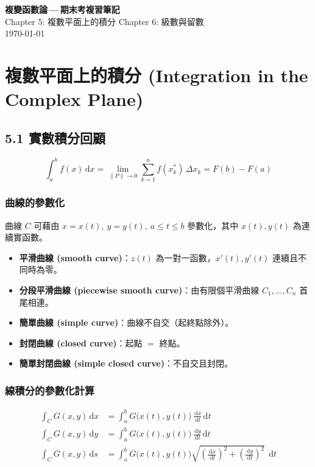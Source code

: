\documentclass[12pt,a4paper]{article}
\newcommand{\dd}{\,\mathrm{d}}
\begin{document}
\begin{center}
{\LARGE\bfseries 複變函數論\,---\,期末考複習筆記}\\[6pt]
{\large Chapter 5: 複數平面上的積分 \quad Chapter 6: 級數與留數}\\[4pt]
\today
\end{center}

\tableofcontents
\newpage

\section{複數平面上的積分 (Integration in the Complex Plane)}

\subsection{5.1 實數積分回顧}

\begin{defbox}[定積分]
$$\int_a^b f(x)\dd{x} = \lim_{\|P\|\to 0}\sum_{k=1}^{n}f(x_k^*)\,\Delta x_k = F(b)-F(a)$$
\end{defbox}

\subsubsection*{曲線的參數化}
曲線 $C$ 可藉由 $x=x(t),\ y=y(t),\ a\le t\le b$ 參數化，其中 $x(t),y(t)$ 為連續實函數。
\begin{itemize}[nosep]
\item \textbf{平滑曲線 (smooth curve)}：$z(t)$ 為一對一函數，$x'(t),y'(t)$ 連續且不同時為零。
\item \textbf{分段平滑曲線 (piecewise smooth curve)}：由有限個平滑曲線 $C_1,\dots,C_n$ 首尾相連。
\item \textbf{簡單曲線 (simple curve)}：曲線不自交（起終點除外）。
\item \textbf{封閉曲線 (closed curve)}：起點 $=$ 終點。
\item \textbf{簡單封閉曲線 (simple closed curve)}：不自交且封閉。
\end{itemize}

\subsubsection*{線積分的參數化計算}
\begin{align}
\int_C G(x,y)\dd{x} &= \int_a^b G\bigl(x(t),y(t)\bigr)\,\frac{\dd{x}}{\dd{t}}\dd{t} \\
\int_C G(x,y)\dd{y} &= \int_a^b G\bigl(x(t),y(t)\bigr)\,\frac{\dd{y}}{\dd{t}}\dd{t} \\
\int_C G(x,y)\dd{s} &= \int_a^b G\bigl(x(t),y(t)\bigr)\sqrt{\left(\frac{\dd{x}}{\dd{t}}\right)^2+\left(\frac{\dd{y}}{\dd{t}}\right)^2}\;\dd{t}
\end{align}
\end{document}
